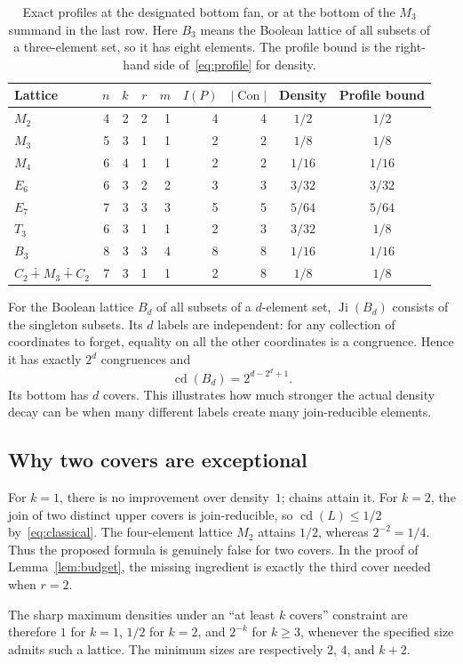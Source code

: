 \documentclass[11pt,a4paper]{article}
\numberwithin{equation}{section}
\theoremstyle{definition}
\theoremstyle{remark}
\DeclareMathOperator{\Con}{Con}
\DeclareMathOperator{\Ji}{Ji}
\DeclareMathOperator{\cdens}{cd}
\newcommand{\glue}{\mathbin{\dotplus}}
\newcommand{\card}[1]{\lvert #1\rvert}
\begin{document}
\begin{table}[htbp]
\centering\small
\begin{tabular}{@{}lrrrrrrcc@{}}
\toprule
Lattice & $n$ & $k$ & $r$ & $m$ & $I(P)$ & $\card{\Con}$ & Density & Profile bound\\
\midrule
$M_2$ &4&2&2&1&4&4&$1/2$&$1/2$\\
$M_3$ &5&3&1&1&2&2&$1/8$&$1/8$\\
$M_4$ &6&4&1&1&2&2&$1/16$&$1/16$\\
$E_6$ &6&3&2&2&3&3&$3/32$&$3/32$\\
$E_7$ &7&3&3&3&5&5&$5/64$&$5/64$\\
$T_3$ &6&3&1&1&2&3&$3/32$&$1/8$\\
$B_3$ &8&3&3&4&8&8&$1/16$&$1/16$\\
$C_2\glue M_3\glue C_2$ &7&3&1&1&2&8&$1/8$&$1/8$\\
\bottomrule
\end{tabular}
\caption{Exact profiles at the designated bottom fan, or at the bottom of the
$M_3$ summand in the last row. Here $B_3$ means the Boolean lattice of all subsets
of a three-element set, so it has eight elements. The profile bound is the
right-hand side of~\eqref{eq:profile} for density.}
\label{tab:profiles}
\end{table}

For the Boolean lattice $B_d$ of all subsets of a $d$-element set,
$\Ji(B_d)$ consists of the singleton subsets. Its $d$ labels are independent:
for any collection of coordinates to forget, equality on all the other
coordinates is a congruence. Hence it has exactly $2^d$ congruences and
\[
 \cdens(B_d)=2^{d-2^d+1}.
\]
Its bottom has $d$ covers. This illustrates how much stronger the actual density
decay can be when many different labels create many join-reducible elements.

\subsection{Why two covers are exceptional}
For $k=1$, there is no improvement over density~$1$; chains attain it.
For $k=2$, the join of two distinct upper covers is join-reducible, so
$\cdens(L)\le1/2$ by~\eqref{eq:classical}. The four-element lattice $M_2$ attains
$1/2$, whereas $2^{-2}=1/4$. Thus the proposed formula is genuinely false for
two covers. In the proof of Lemma~\ref{lem:budget}, the missing ingredient is
exactly the third cover needed when $r=2$.

The sharp maximum densities under an ``at least $k$ covers'' constraint are
therefore $1$ for $k=1$, $1/2$ for $k=2$, and $2^{-k}$ for $k\ge3$, whenever the
specified size admits such a lattice. The minimum sizes are respectively
$2$, $4$, and $k+2$.
\end{document}
